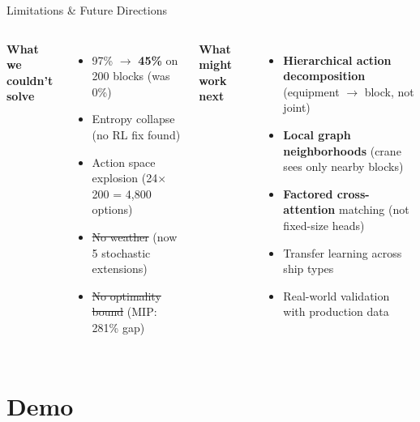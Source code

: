 \documentclass[aspectratio=169,12pt]{beamer}
\begin{document}
\begin{frame}{Limitations \& Future Directions}

\begin{columns}[T]
\textbf{What we couldn't solve}
\vspace{0.3em}
\begin{itemize}
    \setlength\itemsep{0.4em}
    \item 97\% $\to$ \textbf{45\%} on 200 blocks (was 0\%)
    \item Entropy collapse (no RL fix found)
    \item Action space explosion (24$\times$200 = 4,800 options)
    \item {\color{success}\sout{No weather}} {\scriptsize(now 5 stochastic extensions)}
    \item {\color{success}\sout{No optimality bound}} {\scriptsize(MIP: 281\% gap)}
\end{itemize}

\textbf{What might work next}
\vspace{0.3em}
\begin{itemize}
    \setlength\itemsep{0.4em}
    \item \textbf{Hierarchical action decomposition} (equipment $\to$ block, not joint)
    \item \textbf{Local graph neighborhoods} (crane sees only nearby blocks)
    \item \textbf{Factored cross-attention} matching (not fixed-size heads)
    \item Transfer learning across ship types
    \item Real-world validation with production data
\end{itemize}
\end{columns}
\end{frame}

\section{Demo}
\end{document}

